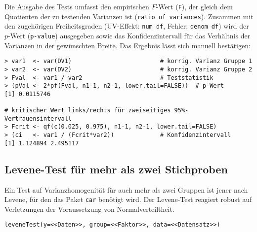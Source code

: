 Die Ausgabe des Tests umfasst den empirischen $F$-Wert (\lstinline!F!), der gleich dem Quotienten der zu testenden Varianzen ist (\lstinline!ratio of variances!). Zusammen mit den zugehörigen Freiheitsgraden (UV-Effekt: \lstinline!num df!, Fehler: \lstinline!denom df!) wird der $p$-Wert (\lstinline!p-value!) ausgegeben sowie das Konfidenzintervall für das Verhältnis der Varianzen in der gewünschten Breite. Das Ergebnis lässt sich manuell bestätigen:
\begin{lstlisting}
> var1  <- var(DV1)                         # korrig. Varianz Gruppe 1
> var2  <- var(DV2)                         # korrig. Varianz Gruppe 2
> Fval  <- var1 / var2                      # Teststatistik
> (pVal <- 2*pf(Fval, n1-1, n2-1, lower.tail=FALSE))  # p-Wert
[1] 0.0115746

# kritischer Wert links/rechts für zweiseitiges 95%-Vertrauensintervall
> Fcrit <- qf(c(0.025, 0.975), n1-1, n2-1, lower.tail=FALSE)
> (ci   <- var1 / (Fcrit*var2))             # Konfidenzintervall
[1] 1.124894 2.495117
\end{lstlisting}

\subsection{Levene-Test für mehr als zwei Stichproben}

Ein Test auf Varianzhomogenität für auch mehr als zwei Gruppen ist jener nach Levene, für den das Paket \lstinline!car! benötigt wird. Der Levene-Test reagiert robust auf Verletzungen der Voraussetzung von Normalverteiltheit.
\begin{lstlisting}
leveneTest(y=<<Daten>>, group=<<Faktor>>, data=<<Datensatz>>)
\end{lstlisting}

